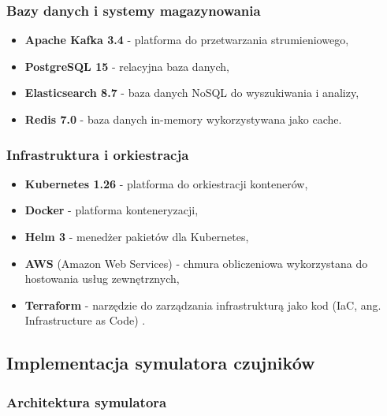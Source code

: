 \subsubsection{Bazy danych i systemy magazynowania}
\label{subsubsec:bazy_danych}

\begin{itemize}
    \item \textbf{Apache Kafka 3.4} \cite{kafka} - platforma do przetwarzania strumieniowego,
    \item \textbf{PostgreSQL 15} - relacyjna baza danych,
    \item \textbf{Elasticsearch 8.7} - baza danych NoSQL \cite{nosql_definition} do wyszukiwania i analizy,
    \item \textbf{Redis 7.0} - baza danych in-memory wykorzystywana jako cache.
\end{itemize}

\subsubsection{Infrastruktura i orkiestracja}
\label{subsubsec:infrastruktura}

\begin{itemize}
    \item \textbf{Kubernetes 1.26} \cite{kubernetes} - platforma do orkiestracji kontenerów,
    \item \textbf{Docker} - platforma konteneryzacji,
    \item \textbf{Helm 3} - menedżer pakietów dla Kubernetes,
    \item \textbf{AWS} (Amazon Web Services) \cite{aws_definition} - chmura obliczeniowa wykorzystana do hostowania usług zewnętrznych,
    \item \textbf{Terraform} - narzędzie do zarządzania infrastrukturą jako kod (IaC, ang. Infrastructure as Code) \cite{terraform_docs}.
\end{itemize}

\subsection{Implementacja symulatora czujników}
\label{subsec:implementacja_symulatora}

\subsubsection{Architektura symulatora}
\label{subsubsec:architektura_symulatora}


